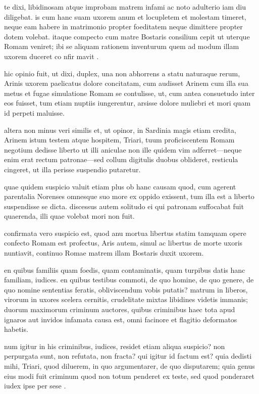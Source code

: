  te dixi, libidinosam atque improbam matrem infami ac noto adulterio iam diu diligebat. is cum hanc suam uxorem anum et locupletem et molestam timeret, neque eam habere in matrimonio propter foeditatem neque dimittere propter dotem volebat. itaque compecto cum matre Bostaris consilium cepit ut uterque Romam veniret; ibi se aliquam rationem inventurum quem ad modum illam uxorem duceret co nfir mavit .

 hic opinio fuit, ut dixi, duplex, una non abhorrens a statu naturaque rerum, Arinis uxorem paelicatus dolore concitatam, cum audisset Arinem cum illa sua metus et fugae simulatione Romam se contulisse, ut, cum antea consuetudo inter eos fuisset, tum etiam nuptiis iungerentur, arsisse dolore muliebri et mori quam id perpeti maluisse.

 altera non minus veri similis et, ut opinor, in Sardinia magis etiam credita, Arinem istum testem atque hospitem, Triari, tuum proficiscentem Romam negotium dedisse liberto ut illi aniculae non ille quidem vim adferret—neque enim erat rectum patronae—sed collum digitulis duobus oblideret, resticula cingeret, ut illa perisse suspendio putaretur.

 quae quidem suspicio valuit etiam plus ob hanc causam quod, cum agerent parentalia Norenses omnesque suo more ex oppido exissent, tum illa est a liberto suspendisse se dicta. discessus autem solitudo ei qui patronam suffocabat fuit quaerenda, illi quae volebat mori non fuit.

 confirmata vero suspicio est, quod anu mortua libertus statim tamquam opere confecto Romam est profectus, Aris autem, simul ac libertus de morte uxoris nuntiavit, continuo Romae matrem illam Bostaris duxit uxorem.

 en quibus familiis quam foedis, quam contaminatis, quam turpibus datis hanc familiam, iudices. en quibus testibus commoti, de quo homine, de quo genere, de quo nomine sententias feratis, obliviscendum vobis putatis? matrum in liberos, virorum in uxores scelera cernitis, crudelitate mixtas libidines videtis immanis; duorum maximorum criminum auctores, quibus criminibus haec tota apud ignaros aut invidos infamata causa est, omni facinore et flagitio deformatos habetis.

 num igitur in his criminibus, iudices, residet etiam aliqua suspicio? non perpurgata sunt, non refutata, non fracta? qui igitur id factum est? quia dedisti mihi, Triari, quod diluerem, in quo argumentarer, de quo disputarem; quia genus eius modi fuit criminum quod non totum penderet ex teste, sed quod ponderaret iudex ipse per sese .

